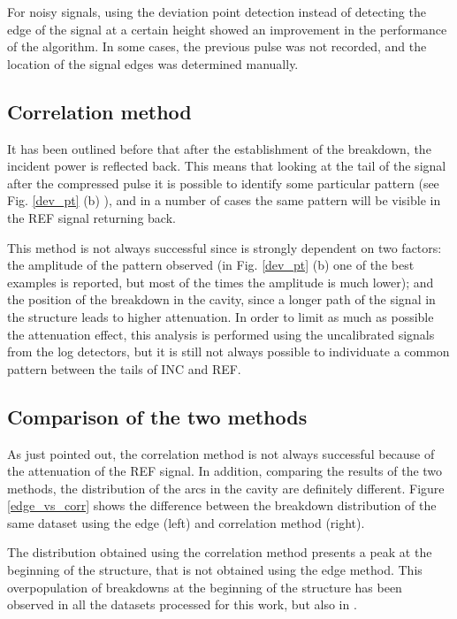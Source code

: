 For noisy signals, using the deviation point detection instead of detecting the edge of the signal at a certain height showed an improvement in the performance of the algorithm. In some cases, the previous pulse was not recorded, and the location of the signal edges was determined manually.

\subsection[Correlation method]{Correlation method}

It has been outlined before that after the establishment of the breakdown, the incident power is reflected back. This means that looking at the tail of the signal after the compressed pulse it is possible to identify some particular pattern (see Fig. \ref{dev_pt} (b) ), and in a number of cases the same pattern will be visible in the REF signal returning back. 

This method is not always successful since is strongly dependent on two factors: the amplitude of the pattern observed (in Fig. \ref{dev_pt} (b) one of the best examples is reported, but most of the times the amplitude is much lower); and the position of the breakdown in the cavity, since a longer path of the signal in the structure leads to higher attenuation. In order to limit as much as possible the attenuation effect, this analysis is performed using the uncalibrated signals from the log detectors, but it is still not always possible to individuate a common pattern between the tails of INC and REF.


\subsection[Comparison of the two methods]{Comparison of the two methods} 
As just pointed out, the correlation method is not always successful because of the attenuation of the REF signal. In addition, comparing the results of the two methods, the distribution of the arcs in the cavity are definitely different. Figure \ref{edge_vs_corr} shows the difference between the breakdown distribution of the same dataset using the edge (left) and correlation method (right). 

The distribution obtained using the correlation method presents a peak at the beginning of the structure, that is not obtained using the edge method. This overpopulation of breakdowns at the beginning of the structure has been observed in all the datasets processed for this work, but also in \cite{Rajamaki:2143815}.  

